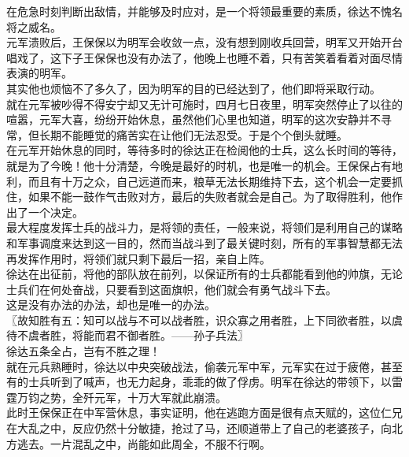 \begin{multicols}{\theparacolNo}
在危急时刻判断出敌情，并能够及时应对，是一个将领最重要的素质，徐达不愧名将之威名。\\

元军溃败后，王保保以为明军会收敛一点，没有想到刚收兵回营，明军又开始开台唱戏了，这下子王保保也没有办法了，他晚上也睡不着，只有苦笑着看着对面尽情表演的明军。\\

其实他也烦恼不了多久了，因为明军的目的已经达到了，他们即将采取行动。\\

就在元军被吵得不得安宁却又无计可施时，四月七日夜里，明军突然停止了以往的喧嚣，元军大喜，纷纷开始休息，虽然他们心里也知道，明军的这次安静并不寻常，但长期不能睡觉的痛苦实在让他们无法忍受。于是个个倒头就睡。\\

在元军开始休息的同时，等待多时的徐达正在检阅他的士兵，这么长时间的等待，就是为了今晚！他十分清楚，今晚是最好的时机，也是唯一的机会。王保保占有地利，而且有十万之众，自己远道而来，粮草无法长期维持下去，这个机会一定要抓住，如果不能一鼓作气击败对方，最后的失败者就会是自己。为了取得胜利，他作出了一个决定。\\

最大程度发挥士兵的战斗力，是将领的责任，一般来说，将领们是利用自己的谋略和军事调度来达到这一目的，然而当战斗到了最关键时刻，所有的军事智慧都无法再发挥作用时，将领们就只剩下最后一招，亲自上阵。\\

徐达在出征前，将他的部队放在前列，以保证所有的士兵都能看到他的帅旗，无论士兵们在何处奋战，只要看到这面旗帜，他们就会有勇气战斗下去。\\

这是没有办法的办法，却也是唯一的办法。\\

〖故知胜有五：知可以战与不可以战者胜，识众寡之用者胜，上下同欲者胜，以虞待不虞者胜，将能而君不御者胜。——孙子兵法〗\\

徐达五条全占，岂有不胜之理！\\

就在元兵熟睡时，徐达以中央突破战法，偷袭元军中军，元军实在过于疲倦，甚至有的士兵听到了喊声，也无力起身，乖乖的做了俘虏。明军在徐达的带领下，以雷霆万钧之势，全歼元军，十万大军就此崩溃。\\

此时王保保正在中军营休息，事实证明，他在逃跑方面是很有点天赋的，这位仁兄在大乱之中，反应仍然十分敏捷，抢过了马，还顺道带上了自己的老婆孩子，向北方逃去。一片混乱之中，尚能如此周全，不服不行啊。\\


\end{multicols}
